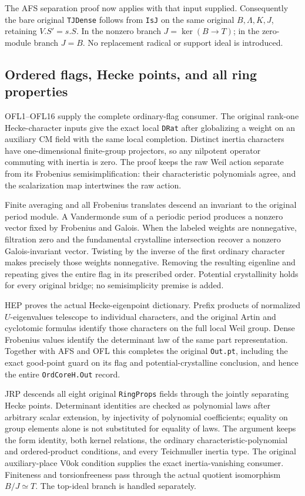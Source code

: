 The AFS separation proof now applies with that input supplied.
Consequently the bare original \texttt{TJDense} follows from
\texttt{IsJ} on the same original $B,\Lambda,K,J$, retaining
$V.S'=s.S$.  In the nonzero branch $J=\ker(B\to T)$;
in the zero-module branch $J=B$.  No replacement radical or
support ideal is introduced.

\subsection{Ordered flags, Hecke points, and all ring properties}

OFL1--OFL16 supply the complete ordinary-flag consumer.
The original rank-one Hecke-character inputs give the exact local
\texttt{DRat} after globalizing a weight on an auxiliary CM field
with the same local completion.  Distinct inertia characters have
one-dimensional finite-group projectors, so any nilpotent operator
commuting with inertia is zero.  The proof keeps the raw Weil
action separate from its Frobenius semisimplification: their
characteristic polynomials agree, and the scalarization map
intertwines the raw action.

Finite averaging and all Frobenius translates descend an invariant
to the original period module.  A Vandermonde sum of a periodic
period produces a nonzero vector fixed by Frobenius and Galois.
When the labeled weights are nonnegative, filtration zero and
the fundamental crystalline intersection recover a nonzero
Galois-invariant vector.  Twisting by the inverse of the first
ordinary character makes precisely those weights nonnegative.
Removing the resulting eigenline and repeating gives the entire
flag in its prescribed order.  Potential crystallinity holds for
every original bridge; no semisimplicity premise is added.

HEP proves the actual Hecke-eigenpoint dictionary.  Prefix products
of normalized $U$-eigenvalues telescope to individual characters,
and the original Artin and cyclotomic formulas identify those
characters on the full local Weil group.  Dense Frobenius values
identify the determinant law of the same part representation.
Together with AFS and OFL this completes the original
\texttt{Out.pt}, including the exact good-point guard on its
flag and potential-crystalline conclusion, and hence the entire
\texttt{OrdCoreH.Out} record.

JRP descends all eight original \texttt{RingProps} fields through
the jointly separating Hecke points.  Determinant identities are
checked as polynomial laws after arbitrary scalar extension, by
injectivity of polynomial coefficients; equality on group elements
alone is not substituted for equality of laws.  The argument keeps
the form identity, both kernel relations, the ordinary
characteristic-polynomial and ordered-product conditions, and every
Teichmuller inertia type.  The original auxiliary-place
$\mathrm{V0ok}$ condition supplies the exact inertia-vanishing
consumer.  Finiteness and torsionfreeness pass through the actual
quotient isomorphism $B/J\simeq T$.  The top-ideal branch is
handled separately.

